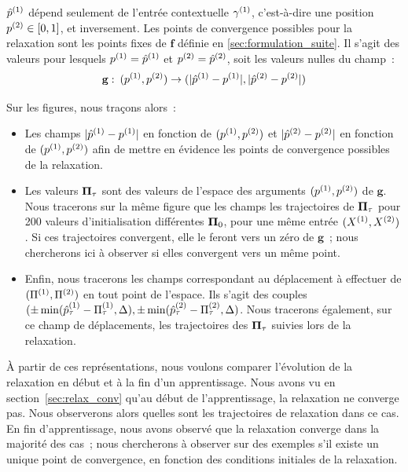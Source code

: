 \documentclass[../main]{subfiles}
\begin{document}
$\hat{p}^{({1})}$ dépend seulement de l'entrée contextuelle $\gamma^{({1})}$, c'est-à-dire une position $p^{({2})} \in [0,1]$, et inversement.
Les points de convergence possibles pour la relaxation sont les points fixes de $\mathbf{f}$ définie en \ref{sec:formulation_suite}. Il s'agit des valeurs pour lesquels $p^{({1})} = \hat{p}^{({1})}$ et $p^{({2})} = \hat{p}^{({2})}$, soit les valeurs nulles du champ~:
\begin{equation} 
	\mathbf{g}:\: (p^{({1})}, p^{({2})}) \rightarrow (\lvert \hat{p}^{({1})} - p^{({1})} \rvert,  \lvert \hat{p}^{({2})} - p^{({2})} \rvert)
\end{equation}

Sur les figures, nous traçons alors~:

\begin{itemize}
\item Les champs $\lvert \hat{p}^{({1})} - p^{({1})} \rvert$ en fonction de $(p^{({1})}, p^{({2})})$ et $\lvert \hat{p}^{({2})} - p^{({2})} \rvert$ en fonction de $(p^{({1})}, p^{({2})})$ afin de mettre en évidence les points de convergence possibles de la relaxation. 
\item Les valeurs $\mathbf{\Pi}_\tau$ sont des valeurs de l'espace des arguments $(p^{({1})}, p^{({2})})$ de $\mathbf{g}$. Nous tracerons sur la même figure que les champs les trajectoires de $\mathbf{\Pi}_\tau$ pour 200 valeurs d'initialisation différentes $\mathbf{\Pi}_0$, pour une même entrée $(X^{({1})}, X^{({2})})$. Si ces trajectoires convergent, elle le feront vers un zéro de $\mathbf{g}$~; nous chercherons ici à observer si elles convergent vers un même point.
\item Enfin, nous tracerons les champs correspondant au déplacement à effectuer de $(\Pi^{({1})},\Pi^{({2})})$ en tout point de l'espace. Ils s'agit des couples $(\pm \min(\hat{p}^{({1})}_\tau - \Pi^{({1})}_\tau, \Delta), \pm \min(\hat{p}^{({2})}_\tau - \Pi^{({2})}_\tau, \Delta)$. Nous tracerons également, sur ce champ de déplacements, les trajectoires des $\mathbf{\Pi}_\tau$ suivies lors de la relaxation.
\end{itemize}

\`A partir de ces représentations, nous voulons comparer l'évolution de la relaxation en début et à la fin d'un apprentissage. 
Nous avons vu en section~\ref{sec:relax_conv} qu'au début de l'apprentissage, la relaxation ne converge pas. Nous observerons alors quelles sont les trajectoires de relaxation dans ce cas.
En fin d'apprentissage, nous avons observé que la relaxation converge dans la majorité des cas~; nous chercherons à observer sur des exemples s'il existe un unique point de convergence, en fonction des conditions initiales de la relaxation.
\end{document}
